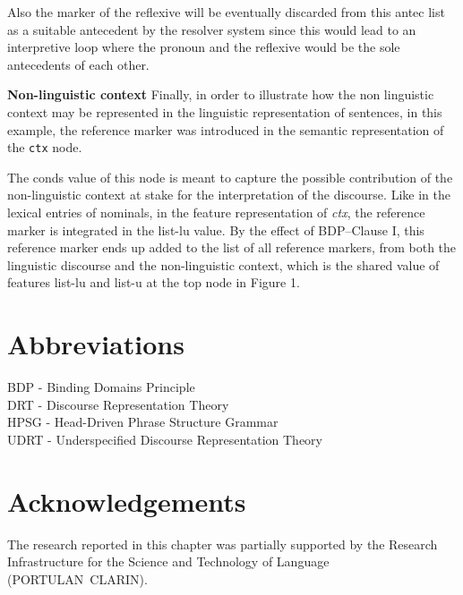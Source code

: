 \documentclass[output=paper
,modfonts
,nonflat]{langsci/langscibook}
\begin{document}
\begin{paperappendix}
Also the marker 
of the reflexive
will be eventually discarded from this {\sc antec} list as a suitable antecedent by the resolver system
since this would lead to an interpretive loop where the pronoun and the
reflexive would be the sole antecedents of each other.

\textbf{Non-linguistic context} Finally, in order to illustrate how the non linguistic context may be represented 
in the linguistic representation of sentences, 
in this example, the reference marker  
was introduced in the semantic representation of the \texttt{ctx} node. 

The {\sc conds} value of this node is meant to capture the possible contribution 
of the non-linguistic context at stake for the interpretation of the discourse. 
Like in the lexical entries of nominals, in the feature representation of {\em ctx},
the reference marker 
is integrated in the {\sc list-lu} value.
By the effect of BDP--Clause I, this reference marker ends up added to the list of 
all reference markers, from both the linguistic discourse and the non-linguistic
context, which is the shared value of features {\sc list-lu} and {\sc list-u} at the top node in Figure 1.

\end{paperappendix}


\section*{Abbreviations}

BDP - Binding Domains Principle\\
DRT - Discourse Representation Theory\\
HPSG - Head-Driven Phrase Structure Grammar\\
UDRT - Underspecified Discourse Representation Theory

\section*{Acknowledgements}

The research reported in this chapter was partially supported by the 
Research Infrastructure  for  the Science  and  Technology of Language (\mbox{PORTULAN CLARIN}).


{\sloppy
\printbibliography[heading=subbibliography,notkeyword=this]
}
\end{document}
